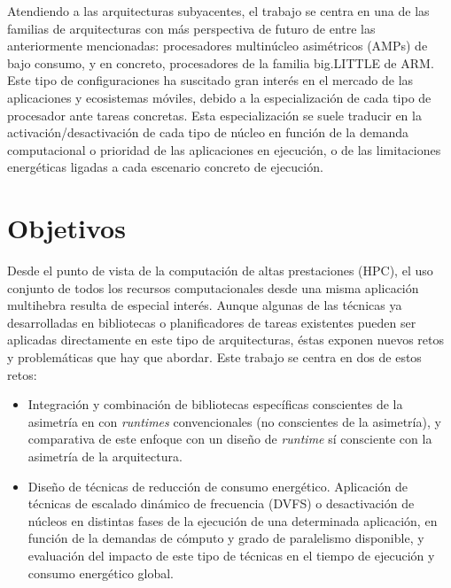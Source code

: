 Atendiendo a las arquitecturas subyacentes, el trabajo se centra en una de
las familias de arquitecturas con más perspectiva de futuro de entre las
anteriormente mencionadas: procesadores multinúcleo asimétricos (AMPs) de
bajo consumo, y en concreto, procesadores de la familia big.LITTLE de ARM.
Este tipo de configuraciones ha suscitado gran interés en el mercado de las
aplicaciones y ecosistemas móviles, debido a la especialización de cada
tipo de procesador ante tareas concretas. Esta especialización se suele
traducir en la activación/desactivación de cada tipo de núcleo en función
de la demanda computacional o prioridad de las aplicaciones en ejecución, o
de las limitaciones energéticas ligadas a cada escenario concreto de
ejecución.


\section{Objetivos}
Desde el punto de vista de la computación de altas prestaciones (HPC), el
uso conjunto de todos los recursos computacionales desde una misma
aplicación multihebra resulta de especial interés. Aunque algunas de las
técnicas ya desarrolladas en bibliotecas o planificadores de tareas
existentes pueden ser aplicadas directamente en este tipo de arquitecturas,
éstas exponen nuevos retos y problemáticas que hay que abordar. Este
trabajo se centra en dos de estos retos:
\begin{itemize}
\item Integración y combinación de bibliotecas específicas conscientes de la asimetría en
  con \emph{runtimes} convencionales (no conscientes de la
  asimetría), y comparativa de este enfoque con un diseño de \emph{runtime}
  sí consciente con la asimetría de la arquitectura.

\item Diseño de técnicas de reducción de consumo energético. Aplicación de
  técnicas de escalado dinámico de frecuencia (DVFS) o desactivación de
  núcleos en distintas fases de la ejecución de una determinada aplicación,
  en función de la demandas de cómputo y grado de paralelismo disponible, y
  evaluación del impacto de este tipo de técnicas en el tiempo de ejecución
  y consumo energético global.
\end{itemize}


